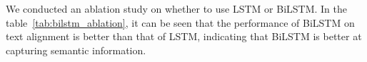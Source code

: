 We conducted an ablation study on whether to use LSTM or BiLSTM. In the table~\ref{tab:bilstm_ablation}, it can be seen that the performance of BiLSTM on text alignment is better than that of LSTM, indicating that BiLSTM is better at capturing semantic information.

